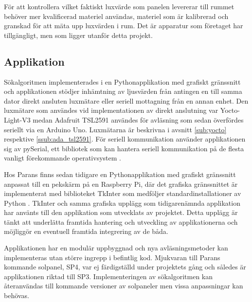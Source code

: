             För att kontrollera vilket faktiskt luxvärde som panelen levererar till rummet behöver mer kvalificerad materiel användas, materiel som är kalibrerad och granskad för att mäta upp luxvärden i rum. Det är apparatur som företaget har tillgängligt, men som ligger utanför detta projekt.

    \subsection{Applikation} %
    \label{sub:applikation}
        Sökalgoritmen implementerades i en Pythonapplikation med grafiskt gränssnitt och applikationen stödjer inhämtning av ljusvärden från antingen en till samma dator direkt ansluten luxmätare eller seriell mottagning från en annan enhet. Den luxmätare som användes vid implementationen av direkt anslutning var Yocto-Light-V3 medan Adafruit TSL2591 användes för avläsning som sedan överfördes seriellt via en Arduino Uno. Luxmätarna är beskrivna i avsnitt \ref{sub:yocto} respektive \ref{ssub:ada_tsl2591}. För seriell kommunikation använder applikationen sig av pySerial, ett bibliotek som kan hantera seriell kommunikation på de flesta vanligt förekommande operativsystem \cite{pyserial}. \bigskip

        Hos Parans finns sedan tidigare en Pythonapplikation med grafiskt gränssnitt anpassat till en pekskärm på en Raspberry Pi, där det grafiska gränssnittet är implementerat med biblioteket TkInter som medföljer standardinstallationer av Python \cite{solarremote}. TkInter och samma grafiska upplägg som tidigarenämnda applikation har använts till den applikation som utvecklats av projektet. Detta upplägg är tänkt att underlätta framtida hantering och utveckling av applikationerna och möjliggör en eventuell framtida integrering av de båda. \bigskip

        Applikationen har en modulär uppbyggnad och nya avläsningsmetoder kan implementeras utan större ingrepp i befintlig kod. Mjukvaran till Parans kommande solpanel, SP4, var ej färdigställd under projektets gång och således är applikationen riktad till SP3. Implementeringen av sökalgoritmen kan återanvändas till kommande versioner av solpaneler men vissa anpassningar kan behövas.
